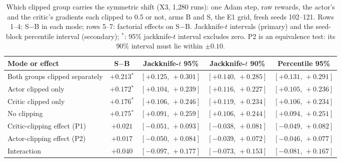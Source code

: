 \begin{table}[!htbp]
\caption{Which clipped group carries the symmetric shift (X3, 1,280 runs): one Adam step, raw rewards, the actor's and the critic's gradients each clipped to 0.5 or not, arms B and S, the E1 grid, fresh seeds 102--121. Rows 1--4: S$-$B in each mode; rows 5--7: factorial effects on S$-$B. Jackknife-$t$ intervals (primary) and the seed-block percentile interval (secondary); $^{\ast}$: 95\% jackknife-$t$ interval excludes zero. P2 is an equivalence test: its 90\% interval must lie within $\pm0.10$.}
\label{tab:x3}
\centering\footnotesize
\begin{tabular}{@{}>{\raggedright\arraybackslash}p{}cccc@{}}
\toprule
Mode or effect & S$-$B & Jackknife-$t$ 95\% & Jackknife-$t$ 90\% & Percentile 95\% \\
\midrule
Both groups clipped separately & $+0.213$$^{\ast}$ & $[+0.125,\,+0.301]$ & $[+0.140,\,+0.285]$ & $[+0.131,\,+0.291]$ \\
Actor clipped only & $+0.172$$^{\ast}$ & $[+0.104,\,+0.239]$ & $[+0.116,\,+0.227]$ & $[+0.105,\,+0.236]$ \\
Critic clipped only & $+0.176$$^{\ast}$ & $[+0.106,\,+0.246]$ & $[+0.119,\,+0.234]$ & $[+0.106,\,+0.234]$ \\
No clipping & $+0.175$$^{\ast}$ & $[+0.091,\,+0.259]$ & $[+0.106,\,+0.244]$ & $[+0.094,\,+0.251]$ \\
Critic-clipping effect (P1) & $+0.021$ & $[-0.051,\,+0.093]$ & $[-0.038,\,+0.081]$ & $[-0.049,\,+0.082]$ \\
Actor-clipping effect (P2) & $+0.017$ & $[-0.050,\,+0.084]$ & $[-0.039,\,+0.072]$ & $[-0.046,\,+0.077]$ \\
Interaction & $+0.040$ & $[-0.097,\,+0.177]$ & $[-0.073,\,+0.153]$ & $[-0.081,\,+0.167]$ \\
\bottomrule
\end{tabular}
\end{table}
